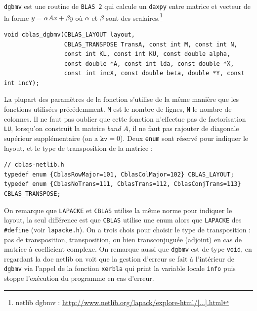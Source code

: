 \documentclass{article}
\begin{document}
\texttt{dgbmv} est une routine de \texttt{BLAS 2} qui calcule un \texttt{daxpy} entre matrice et vecteur de la forme \(y = \alpha Ax + \beta y\) où $\alpha$ et $\beta$ sont des scalaires.\footnote{netlib dgbmv : \href{http://www.netlib.org/lapack/explore-html/d7/d15/group__double__blas__level2_ga0dc187c15a47772440defe879d034888.html}{http://www.netlib.org/lapack/explore-html/[...].html}}
\begin{scriptsize}
\begin{verbatim}
void cblas_dgbmv(CBLAS_LAYOUT layout,
                 CBLAS_TRANSPOSE TransA, const int M, const int N,
                 const int KL, const int KU, const double alpha,
                 const double *A, const int lda, const double *X,
                 const int incX, const double beta, double *Y, const int incY);
\end{verbatim}
\end{scriptsize}
La plupart des paramètres de la fonction s'utilise de la même manière que les fonctions utilisées précédemment. \texttt{M} est le nombre de lignes, \texttt{N} le nombre de colonnes. Il ne faut pas oublier que cette fonction n'effectue pas de factorisation \texttt{LU}, lorsqu'on construit la matrice \textit{band} $A$, il ne faut pas rajouter de diagonale supérieur supplémentaire (on a $\texttt{kv} = 0$). Deux \texttt{enum} sont réservé pour indiquer le layout, et le type de transposition de la matrice :
\begin{scriptsize}
\begin{verbatim}
// cblas-netlib.h 
typedef enum {CblasRowMajor=101, CblasColMajor=102} CBLAS_LAYOUT;
typedef enum {CblasNoTrans=111, CblasTrans=112, CblasConjTrans=113} CBLAS_TRANSPOSE;
\end{verbatim}
\end{scriptsize}
On remarque que \texttt{LAPACKE} et \texttt{CBLAS} utilise la même norme pour indiquer le layout, la seul différence est que \texttt{CBLAS} utilise une enum alors que \texttt{LAPACKE} des \texttt{\#define} (voir \texttt{lapacke.h}). On a trois chois pour choisir le type de transposition : pas de transposition, transposition, ou bien transconjuguée (adjoint) en cas de matrice à coefficient complexe.
On remarque aussi que \texttt{dgbmv} est de type \texttt{void}, en regardant la doc netlib on voit que la gestion d'erreur se fait à l'intérieur de \texttt{dgbmv} via l'appel de la fonction \texttt{xerbla} qui print la variable locale \texttt{info} puis stoppe l'exécution du programme en cas d'erreur.
\end{document}
